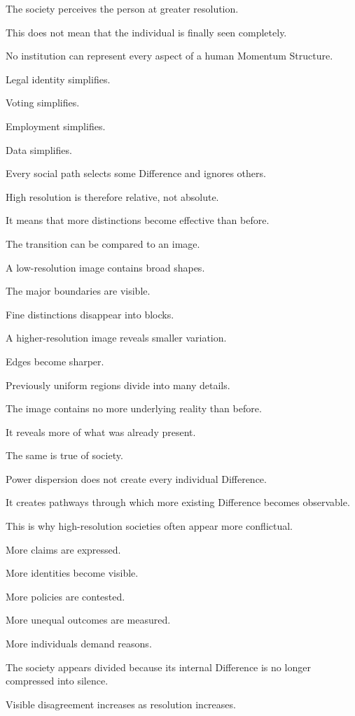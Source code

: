 The society perceives the person at greater resolution.

This does not mean that the individual is finally seen completely.

No institution can represent every aspect of a human Momentum Structure.

Legal identity simplifies.

Voting simplifies.

Employment simplifies.

Data simplifies.

Every social path selects some Difference and ignores others.

High resolution is therefore relative, not absolute.

It means that more distinctions become effective than before.

The transition can be compared to an image.

A low-resolution image contains broad shapes.

The major boundaries are visible.

Fine distinctions disappear into blocks.

A higher-resolution image reveals smaller variation.

Edges become sharper.

Previously uniform regions divide into many details.

The image contains no more underlying reality than before.

It reveals more of what was already present.

The same is true of society.

Power dispersion does not create every individual Difference.

It creates pathways through which more existing Difference becomes observable.

This is why high-resolution societies often appear more conflictual.

More claims are expressed.

More identities become visible.

More policies are contested.

More unequal outcomes are measured.

More individuals demand reasons.

The society appears divided because its internal Difference is no longer compressed into silence.

Visible disagreement increases as resolution increases.

